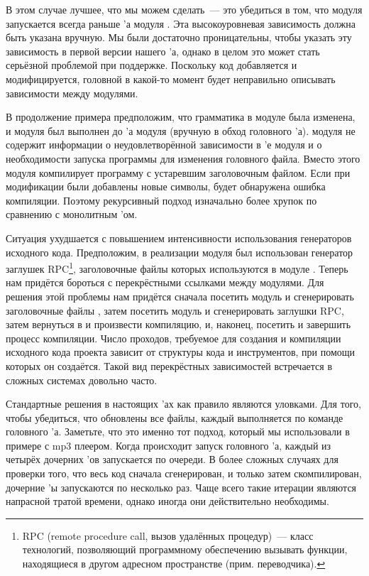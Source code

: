 В этом случае лучшее, что мы можем сделать~--- это убедиться в том,
что \Makefile{} модуля  запускается всегда раньше
\Makefile{}'а модуля . Эта высокоуровневая зависимость
должна быть указана вручную. Мы были достаточно проницательны, чтобы
указать эту зависимость в первой версии нашего \Makefile{}'а, однако в
целом это может стать серьёзной проблемой при поддержке. Поскольку код
добавляется и модифицируется, головной \Makefile{} в какой-то момент
будет неправильно описывать зависимости между модулями.

В продолжение примера предположим, что грамматика  в
модуле  была изменена, и \Makefile{} модуля 
был выполнен до \Makefile{}'а модуля  (вручную в обход
головного \Makefile{}'а). \Makefile{} модуля  не содержит
информации о неудовлетворённой зависимости в \Makefile{}'е модуля
 и о необходимости запуска программы  для
изменения головного файла. Вместо этого \Makefile{} модуля
 компилирует программу с устаревшим заголовочным
файлом. Если при модификации были добавлены новые символы, будет
обнаружена ошибка компиляции. Поэтому рекурсивный подход изначально
более хрупок по сравнению с монолитным \Makefile{}'ом.

Ситуация ухудшается с повышением интенсивности использования
генераторов исходного кода. Предположим, в реализации модуля
 был использован генератор заглушек RPC\footnote{
RPC (remote procedure call, вызов удалённых процедур)~--- класс
технологий, позволяющий программному обеспечению вызывать функции,
находящиеся в другом адресном пространстве (прим. переводчика).
},
заголовочные файлы которых используются в модуле
. Теперь нам придётся бороться с перекрёстными ссылками
между модулями. Для решения этой проблемы нам придётся сначала
посетить модуль  и сгенерировать заголовочные файлы
, затем посетить модуль  и сгенерировать
заглушки RPC, затем вернуться в  и произвести компиляцию,
и, наконец, посетить  и завершить процесс компиляции. Число
проходов, требуемое для создания и компиляции исходного кода проекта
зависит от структуры кода и инструментов, при помощи которых он
создаётся. Такой вид перекрёстных зависимостей встречается в сложных
системах довольно часто.

Стандартные решения в настоящих \Makefile{}'ах как правило являются
уловками. Для того, чтобы убедиться, что обновлены все файлы, каждый
\Makefile{} выполняется по команде головного \Makefile{}'а. Заметьте,
что это именно тот подход, который мы использовали в примере с mp3
плеером. Когда происходит запуск головного \Makefile{}'а, каждый из
четырёх дочерних \Makefile{}'ов запускается по очереди. В более
сложных случаях для проверки того, что весь код сначала сгенерирован,
и только затем скомпилирован, дочерние \Makefile{}'ы запускаются по
несколько раз. Чаще всего такие итерации являются напрасной тратой
времени, однако иногда они действительно необходимы.

